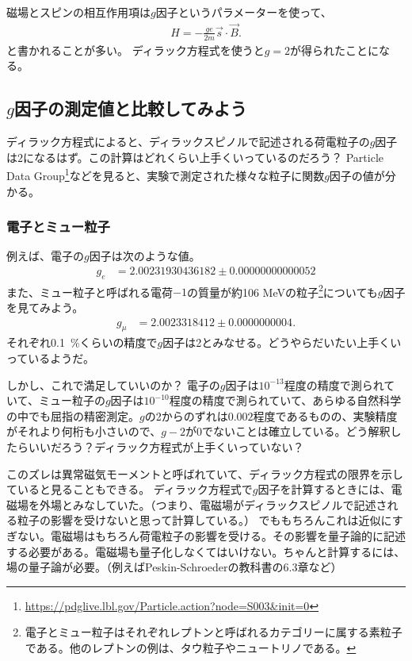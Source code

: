 \documentclass[10pt,a4paper]{jarticle}
\begin{document}
磁場とスピンの相互作用項は$g$因子というパラメーターを使って、
\begin{align}
H = -\frac{ge}{2m} \vec s \cdot \vec B.
\end{align}
と書かれることが多い。
ディラック方程式を使うと$g=2$が得られたことになる。

\subsection{$g$因子の測定値と比較してみよう}
ディラック方程式によると、ディラックスピノルで記述される荷電粒子の$g$因子は$2$になるはず。この計算はどれくらい上手くいっているのだろう？
Particle Data Group\footnote{\url{https://pdglive.lbl.gov/Particle.action?node=S003&init=0}}などを見ると、実験で測定された様々な粒子に関数$g$因子の値が分かる。

\subsubsection{電子とミュー粒子}
例えば、電子の$g$因子は次のような値。
\begin{align}
g_e &= 2.00231930436182 \pm 
      0.00000000000052
\end{align}
また、ミュー粒子と呼ばれる電荷$-1$の質量が約106 MeVの粒子\footnote{電子とミュー粒子はそれぞれレプトンと呼ばれるカテゴリーに属する素粒子である。他のレプトンの例は、タウ粒子やニュートリノである。}についても$g$因子を見てみよう。
\begin{align}
g_\mu &= 2.0023318412 \pm 
        0.0000000004.
\end{align}
それぞれ0.1~\%くらいの精度で$g$因子は2とみなせる。どうやらだいたい上手くいっているようだ。

しかし、これで満足していいのか？
電子の$g$因子は$10^{-13}$程度の精度で測られていて、ミュー粒子の$g$因子は$10^{-10}$程度の精度で測られていて、あらゆる自然科学の中でも屈指の精密測定。$g$の2からのずれは$0.002$程度であるものの、実験精度がそれより何桁も小さいので、$g-2$が0でないことは確立している。どう解釈したらいいだろう？ディラック方程式が上手くいっていない？


このズレは異常磁気モーメントと呼ばれていて、ディラック方程式の限界を示していると見ることもできる。
ディラック方程式で$g$因子を計算するときには、電磁場を外場とみなしていた。（つまり、電磁場がディラックスピノルで記述される粒子の影響を受けないと思って計算している。）
でももちろんこれは近似にすぎない。電磁場はもちろん荷電粒子の影響を受ける。その影響を量子論的に記述する必要がある。電磁場も量子化しなくてはいけない。ちゃんと計算するには、場の量子論が必要。（例えばPeskin-Schroederの教科書の6.3章など）
\end{document}
